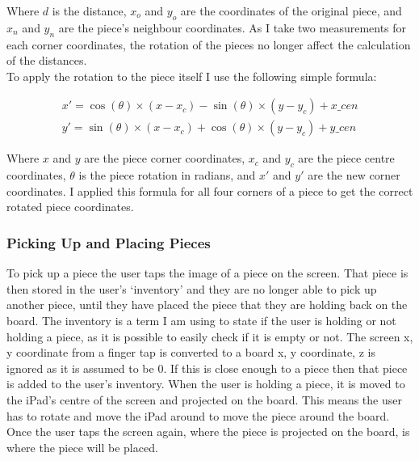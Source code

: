 \documentclass{article}
\begin{document}
Where $d$ is the distance, $x_o$ and $y_o$ are the coordinates of the original
piece, and $x_n$ and $y_n$ are the piece's neighbour coordinates. As I take two
measurements for each corner coordinates, the rotation of the pieces no longer
affect the calculation of the distances.\\

To apply the rotation to the piece itself I use the following simple formula:

\begin{equation*}
\begin{aligned}
x' = \cos(\theta) \times (x - x_c) - \sin(\theta) \times (y - y_c) + x\_cen\\ 
y' = \sin(\theta) \times (x - x_c) + \cos(\theta) \times (y - y_c) + y\_cen
\end{aligned}
\end{equation*}

Where $x$ and $y$ are the piece corner coordinates, $x_c$ and $y_c$ are
the piece centre coordinates, $\theta$ is the piece rotation in radians, and
$x'$ and $y'$ are the new corner coordinates. I applied this formula for all four
corners of a piece to get the correct rotated piece coordinates.

\subsubsection{Picking Up and Placing Pieces}
To pick up a piece the user taps the image of a piece on the screen. That piece
is then stored in the user's `inventory' and they are no longer able to pick up
another piece, until they have placed the piece that they are holding back on
the board. The inventory is a term I am using to state if the user is holding or
not holding a piece, as it is possible to easily check if it is empty or
not. The screen x, y coordinate from a finger tap is converted to a board x, y
coordinate, z is ignored as it is assumed to be 0. If this is close enough to a
piece then that piece is added to the user's inventory. When the user is holding
a piece, it is moved to the iPad's centre of the screen and projected on the
board. This means the user has to rotate and move the iPad around to move the
piece around the board. Once the user taps the screen again, where the piece is
projected on the board, is where the piece will be placed.

\end{document}
